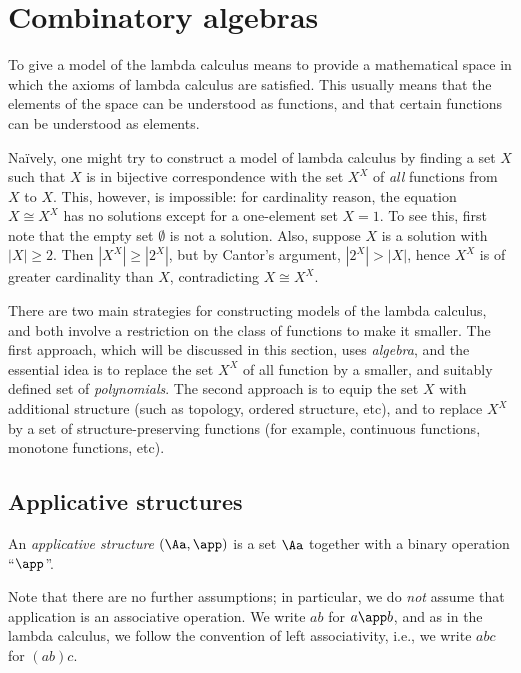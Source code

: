 \documentclass[12pt]{article}
\begin{document}
\section{Combinatory algebras}

To give a model of the lambda calculus means to provide a mathematical
space in which the axioms of lambda calculus are satisfied. This
usually means that the elements of the space can be understood as
functions, and that certain functions can be understood as elements. 

Na\"ively, one might try to construct a model of lambda calculus by
finding a set $X$ such that $X$ is in bijective correspondence with
the set $X^X$ of {\em all} functions from $X$ to $X$. This, however,
is impossible: for cardinality reason, the equation $X\cong X^X$ has
no solutions except for a one-element set $X=1$. To see this, first
note that the empty set $\emptyset$ is not a solution. Also, suppose
$X$ is a solution with $|X|\geq 2$. Then $|X^X|\geq |2^X|$, but by
Cantor's argument, $|2^X|>|X|$, hence $X^X$ is of greater cardinality
than $X$, contradicting $X\cong X^X$.

There are two main strategies for constructing models of the lambda
calculus, and both involve a restriction on the class of functions to
make it smaller. The first approach, which will be discussed in this
section, uses {\em algebra}, and the essential idea is to replace the
set $X^X$ of all function by a smaller, and suitably defined set of
{\em polynomials}. The second approach is to equip the set $X$ with
additional structure (such as topology, ordered structure, etc), and
to replace $X^X$ by a set of structure-preserving functions (for
example, continuous functions, monotone functions, etc).

\subsection{Applicative structures}

\begin{definition}
  An {\em applicative structure} $(\Aa,\app)$ is a set $\Aa$ together
  with a binary operation ``$\app$''.
\end{definition}

Note that there are no further assumptions; in particular, we do {\em
  not} assume that application is an associative operation. We write
$ab$ for $a\app b$, and as in the lambda calculus, we follow the
convention of left associativity, i.e., we write $abc$ for $(ab)c$.
\end{document}
